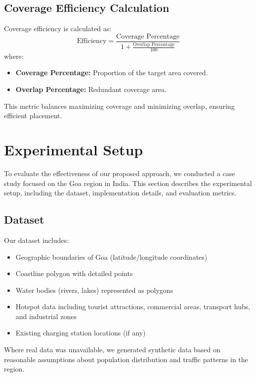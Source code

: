 \documentclass[journal]{IEEEtran}
\begin{document}
\subsection{Coverage Efficiency Calculation}
Coverage efficiency is calculated as:
\begin{equation}
\text{Efficiency} = \frac{\text{Coverage Percentage}}{1 + \frac{\text{Overlap Percentage}}{100}}
\end{equation}
where:
\begin{itemize}
    \item \textbf{Coverage Percentage:} Proportion of the target area covered.
    \item \textbf{Overlap Percentage:} Redundant coverage area.
\end{itemize}

This metric balances maximizing coverage and minimizing overlap, ensuring efficient placement.

\section{Experimental Setup}
To evaluate the effectiveness of our proposed approach, we conducted a case study focused on the Goa region in India. This section describes the experimental setup, including the dataset, implementation details, and evaluation metrics.

\subsection{Dataset}
Our dataset includes:
\begin{itemize}
    \item Geographic boundaries of Goa (latitude/longitude coordinates)
    \item Coastline polygon with detailed points
    \item Water bodies (rivers, lakes) represented as polygons
    \item Hotspot data including tourist attractions, commercial areas, transport hubs, and industrial zones
    \item Existing charging station locations (if any)
\end{itemize}

Where real data was unavailable, we generated synthetic data based on reasonable assumptions about population distribution and traffic patterns in the region.
\end{document}
